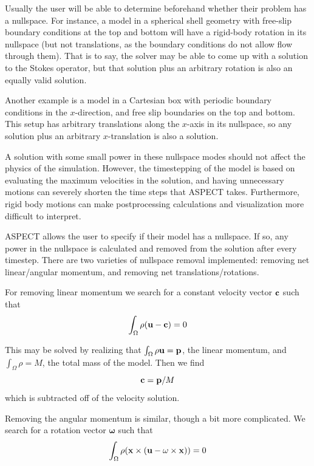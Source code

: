 \documentclass{article}
\newcommand{\aspect}{\textsc{ASPECT}}
\begin{document}
Usually the user will be able to determine beforehand whether their problem has a nullspace.  For instance, 
a model in a spherical shell geometry with free-slip boundary conditions at the top and bottom will 
have a rigid-body rotation in its nullspace (but not translations, as the boundary conditions do not 
allow flow through them).  That is to say, the solver may be able to come up with a solution to 
the Stokes operator, but that solution plus an arbitrary rotation is also an equally valid solution.

Another example is a model in a Cartesian box with periodic boundary conditions in the $x$-direction, 
and free slip boundaries on the top and bottom. This setup has arbitrary translations along the $x$-axis 
in its nullspace, so any solution plus an arbitrary $x$-translation is also a solution.

A solution with some small power in these nullspace modes should not affect the physics of the simulation. 
However, the timestepping of the model is based on evaluating the maximum velocities in the solution, 
and having unnecessary motions can severely shorten the time steps that \aspect{} takes. 
Furthermore, rigid body motions can make postprocessing calculations and visualization more 
difficult to interpret.  

\aspect{} allows the user to specify if their model has a nullspace. If so, any power in the nullspace 
is calculated and removed from the solution after every timestep.
There are two varieties of nullspace removal implemented: removing net linear/angular momentum, and 
removing net translations/rotations. 

For removing linear momentum we search for a constant velocity vector $\bf c$ such that 
\begin{equation*}
\int_\Omega \rho ({\bf u - c}) = 0
\end{equation*}

This may be solved by realizing that $\int_\Omega \rho {\bf u} = {\bf p}$, the linear momentum, and 
$\int_\Omega \rho = M$, the total mass of the model.  Then we find 
\begin{equation*}
{\bf c} = {\bf p}/M
\end{equation*}
which is subtracted off of the velocity solution.
 
Removing the angular momentum is similar, though a bit more complicated. 
We search for a rotation vector $\mathbf \omega$ such that 
\begin{equation*}
\int_\Omega \rho ( {\bf x \times (u - {\mathbf \omega} \times x) } ) = 0
\end{equation*}
\end{document}
